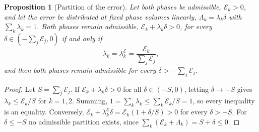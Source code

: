 \documentclass[a4paper,fleqn]{cas-sc}
\newtheorem{proposition}[theorem]{Proposition}
\begin{document}
\begin{proposition}[Partition of the error]\label{prop:lambdaE}
Let both phases be admissible, $\mathcal E_k>0$, and let the error be distributed at fixed phase volumes linearly,
$\Lambda_k=\lambda_k\delta$ with $\sum_k\lambda_k=1$. Both phases remain admissible, $\mathcal E_k+\lambda_k\delta>0$, for every $\delta\in(-\sum_j\mathcal E_j,0)$ if and only if
\begin{equation}
\lambda_k=\lambda^{\mathcal E}_k=\frac{\mathcal E_k}{\sum_j\mathcal E_j} ,
\label{eq:lambdaE}
\end{equation}
and then both phases remain admissible for every $\delta>-\sum_j\mathcal E_j$.
\end{proposition}
\begin{proof}
Let $S=\sum_j\mathcal E_j$. If $\mathcal E_k+\lambda_k\delta>0$ for all $\delta\in(-S,0)$, letting $\delta\to-S$ gives $\lambda_k\le \mathcal E_k/S$ for $k=1,2$. Summing,
$1=\sum_k\lambda_k\le\sum_k\mathcal E_k/S=1$, so every inequality is an equality. Conversely, $\mathcal E_k+\lambda^{\mathcal E}_k\delta=\mathcal E_k(1+\delta/S)>0$ for every $\delta>-S$.
For $\delta\le-S$ no admissible partition exists, since $\sum_k(\mathcal E_k+\Lambda_k)=S+\delta\le0$.
\end{proof}
\end{document}
